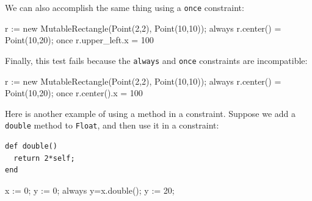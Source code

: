 \documentclass{article}
\begin{document}

We can also accomplish the same thing using a \verb|once| constraint:
\begin{example}
r := new MutableRectangle(Point(2,2), Point(10,10));
always r.center() = Point(10,20);
once r.upper_left.x = 100
\end{example}

Finally, this test fails because the \verb|always| and \verb|once|
constraints are incompatible:
\begin{example}
r := new MutableRectangle(Point(2,2), Point(10,10));
always r.center() = Point(10,20);
once r.center().x = 100
\end{example}




Here is another example of using a method in a constraint.  Suppose we
add a \verb|double| method to \verb|Float|, and then use it in a
constraint:

\begin{verbatim}
def double()
  return 2*self;
end
\end{verbatim}

\begin{example}
x := 0;
y := 0;
always y=x.double();
y := 20;
\end{example}
\end{document}
